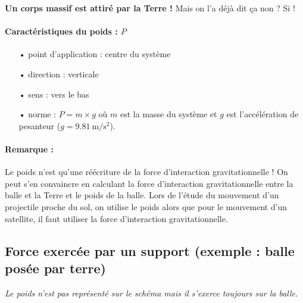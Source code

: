 \documentclass[12pt,a4paper,fleqn]{article}
\begin{document}
\textbf{Un corps massif est attiré par la Terre !}
Mais on l'a déjà dit ça non ?
Si !

\begin{center}
\end{center}

\paragraph{Caractéristiques du poids : $P$}
\begin{itemize}
\item[•] point d'application : centre du système
\item[•] direction : verticale
\item[•] sens : vers le bas
\item[•] norme : $P = m \times g$ où $m$ est la masse du système et $g$ est l'accélération de pesanteur ($g=\qty[per-mode=power, inter-unit-product=\cdot]{9,81}{\meter\per\second\squared}$).
\end{itemize}

\paragraph{Remarque :}
Le poids n'est qu'une réécriture de la force d'interaction gravitationnelle !
On peut s'en convaincre en calculant la force d'interaction gravitationnelle entre la balle et la Terre et le poids de la balle.
Lors de l'étude du mouvement d'un projectile proche du sol, on utilise le poids alors que pour le mouvement d'un satellite, il faut utiliser la force d'interaction gravitationnelle.


\newpage
\subsection{Force exercée par un support (exemple : balle posée par terre)}

\begin{center}
\end{center}
\emph{Le poids n'est pas représenté sur le schéma mais il s'exerce toujours sur la balle.}
\end{document}
